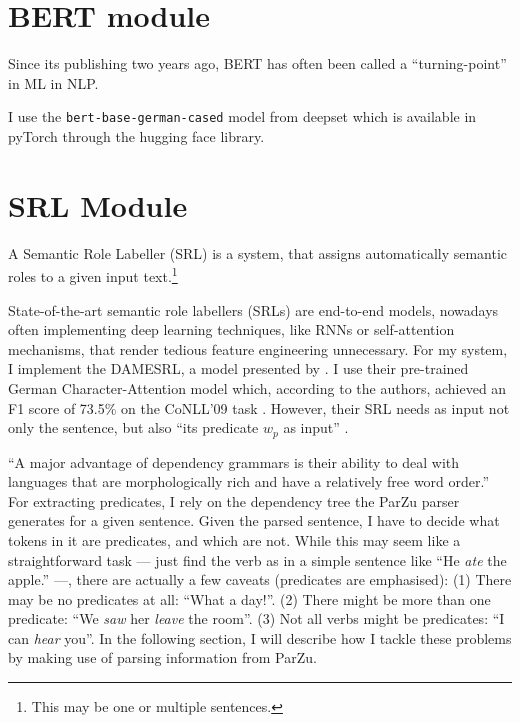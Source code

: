 \section{BERT module}

Since its publishing two years ago, BERT \citep{devlin2018bert} has often been called a ``turning-point'' in ML in NLP.

I use the \texttt{bert-base-german-cased} model from deepset which is available in pyTorch through the hugging face library\cite{wolf2019transformers}.

\section{SRL Module}

A Semantic Role Labeller (SRL) is a system, that assigns automatically semantic roles to a given input text.\footnote{This may be one or multiple sentences.}

State-of-the-art semantic role labellers (SRLs) are end-to-end models, nowadays often implementing deep learning techniques, like RNNs or self-attention mechanisms, that render tedious feature engineering unnecessary.
For my system, I implement the DAMESRL, a model presented by \cite{do2018flexible}.
I use their pre-trained German Character-Attention model which, according to the authors, achieved an F1 score of 73.5\% on the CoNLL'09 task \citep{hajivc2009conll}.
However, their SRL needs as input not only the sentence, but also ``its predicate $w_p$ as input'' \citep{do2018flexible}.

``A major advantage of dependency grammars is their ability to deal with languages that are morphologically rich and have a relatively free word order.'' \citep[p.~274]{jurafsky2019speech}
For extracting predicates, I rely on the dependency tree the ParZu parser \cite{sennrich2013exploiting} generates for a given sentence.
Given the parsed sentence, I have to decide what tokens in it are predicates, and which are not.
While this may seem like a straightforward task --- just find the verb as in a simple sentence like ``He \emph{ate} the apple.'' ---, there are actually a few caveats (predicates are emphasised):
(1) There may be no predicates at all: ``What a day!''. (2) There might be more than one predicate: ``We \emph{saw} her \emph{leave} the room''. (3) Not all verbs might be predicates: ``I can \emph{hear} you''.
In the following section, I will describe how I tackle these problems by making use of parsing information from ParZu.


